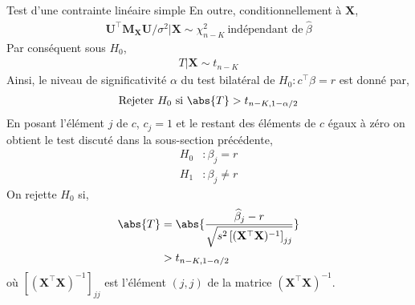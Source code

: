 \begin{frame}[allowframebreaks]{Test d'une contrainte linéaire simple}
En outre, conditionnellement à $\mathbf{X}$,
\begin{align}
\mathbf{U}^\top\mathbf{M}_\mathbf{X}\mathbf{U}/\sigma^2 | \mathbf{X}\sim \chi^2_{n-K} \ \textrm{indépendant de}  \ \widehat{\beta} 
\label{eq42}
\end{align}
Par conséquent sous $H_0$,
\begin{align*}
T | \mathbf{X}\sim t_{n-K}
\end{align*}
Ainsi, le niveau de significativité $\alpha$ du test bilatéral de $H_0: c^\top\beta = r$ est donné par,
\begin{align*}
\textrm{Rejeter} \ H_0 \ \textrm{si} \ \abs{T} > t_{n-K, 1-\alpha/2}
\end{align*}
En posant l'élément $j$ de $c$, $c_j=1$ et le restant des éléments de $c$ égaux à zéro on obtient le test discuté dans la sous-section précédente,
\begin{align*}
H_0&: \beta_j = r\\
H_1&:\beta_j \neq r
\end{align*}
On rejette $H_0$ si,
\begin{align*}
\abs{T} &= \abs{ \frac{\widehat{\beta}_j - r}{\sqrt{s^2\left[(\mathbf{X}^\top\mathbf{X})^{-1}\right]_{jj}}}}\\
&> t_{n-K, 1-\alpha/2}
\end{align*}
où $\left[(\mathbf{X}^\top\mathbf{X})^{-1}\right]_{jj}$ est l'élément $(j,j)$ de la matrice $(\mathbf{X}^\top\mathbf{X})^{-1}$.
\end{frame}

